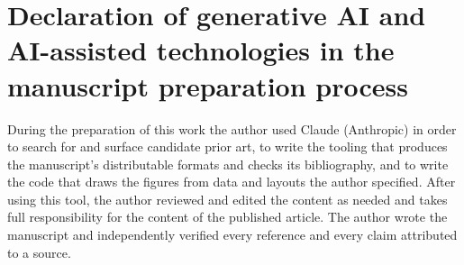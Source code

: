 \documentclass[10pt]{article}
\begin{document}
\section*{Declaration of generative AI and AI-assisted technologies in
the manuscript preparation
process}\label{declaration-of-generative-ai-and-ai-assisted-technologies-in-the-manuscript-preparation-process}

During the preparation of this work the author used Claude (Anthropic)
in order to search for and surface candidate prior art, to write the
tooling that produces the manuscript's distributable formats and checks
its bibliography, and to write the code that draws the figures from data
and layouts the author specified. After using this tool, the author
reviewed and edited the content as needed and takes full responsibility
for the content of the published article. The author wrote the
manuscript and independently verified every reference and every claim
attributed to a source.
\end{document}

